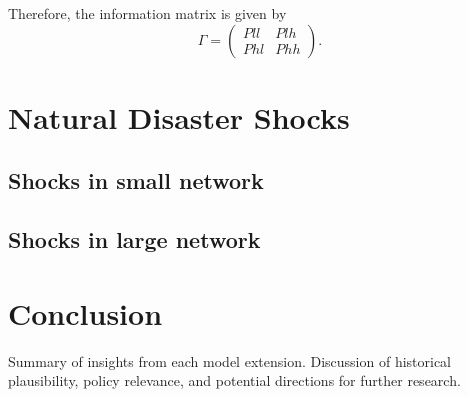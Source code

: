 \documentclass[12pt]{article}
\begin{document}
Therefore, the information matrix is given by
\[
\Gamma = 
\begin{pmatrix}
Pll & Plh \\
Phl & Phh
\end{pmatrix}.
\]


\section{Natural Disaster Shocks}
\subsection{Shocks in small network}
\subsection{Shocks in large network}
\section{Conclusion}
Summary of insights from each model extension. Discussion of historical plausibility, policy relevance, and potential directions for further research.

  
\end{document}
